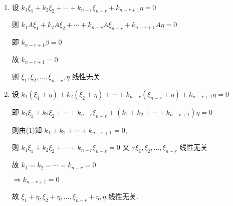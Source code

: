 	 \paragraph{} %
		 \begin{enumerate}
			 \item %
			       设 \( k_{1}\xi_{1} + k_{2}\xi_{2} + \cdots + k_{n-r}\xi_{n-r} + k_{n-r+1}\eta = 0 \)

			       则 \( k_{1}A\xi_{1} + k_{2}A\xi_{2} + \cdots + k_{n-r}A\xi_{n-r} + k_{n-r+1}A\eta = 0 \)

			       即 \( k_{n-r+1}\beta = 0 \)

			       故 \( k_{n-r+1} = 0 \)

			       则 \( \xi_{1}, \xi_{2}, \dots, \xi_{n-r}, \eta \) 线性无关.
			 \item %
			       设 \( k_{1}(\xi_{1}+\eta) + k_{2}(\xi_{2}+\eta) + \cdots + k_{n-r}(\xi_{n-r}+\eta) + k_{n-r+1}\eta = 0 \)

			       即 \( k_{1}\xi_{1} + k_{2}\xi_{2} + \cdots + k_{n-r}\xi_{n-r} + (k_{1}+k_{2}+\cdots+k_{n-r+1})\eta = 0 \)

			       则由(1)知 \( k_{1}+k_{2}+\cdots+k_{n-r+1} = 0 \),

			       则 \( k_{1}\xi_{1} + k_{2}\xi_{2} + \cdots + k_{n-r}\xi_{n-r} = 0 \)
			       又 \( \because \xi_{1}, \xi_{2}, \dots, \xi_{n-r} \) 线性无关

			       故 \( k_{1} = k_{2} = \cdots = k_{n-r} = 0 \)

			       \( \Rightarrow k_{n-r+1} = 0 \)

			       故 \( \xi_{1}+\eta, \xi_{2}+\eta, \dots, \xi_{n-r}+\eta, \eta \) 线性无关.
		 \end{enumerate}


 \subsection{} %


